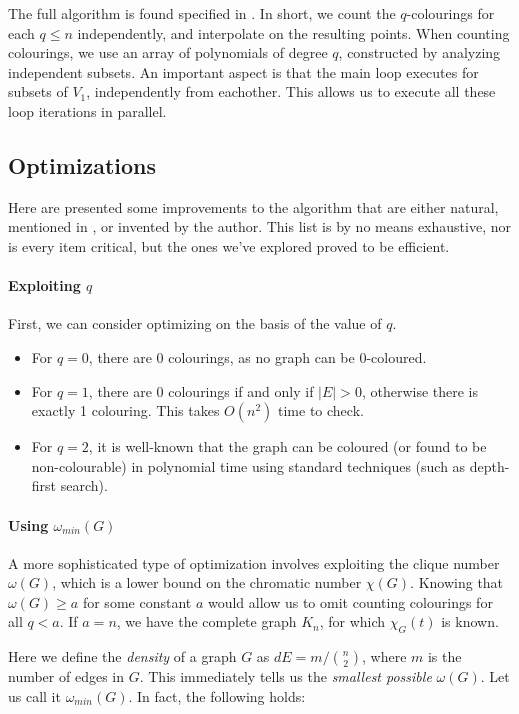 \documentclass[a4paper]{article}
\begin{document}
The full algorithm is found specified in \cite[p. 9]{cov_pack}. In short, we count the $q$-colourings for each $q \leq n$ independently, and interpolate on the resulting points. When counting colourings, we use an array of polynomials of degree $q$, constructed by analyzing independent subsets. An important aspect is that the main loop executes for subsets of $V_1$, independently from eachother. This allows us to execute all these loop iterations in parallel.

\subsection{Optimizations}\label{opts}
Here are presented some improvements to the algorithm that are either natural, mentioned in \cite{cov_pack}, or invented by the author. This list is by no means exhaustive, nor is every item critical, but the ones we've explored proved to be efficient.

\paragraph{Exploiting $q$}
First, we can consider optimizing on the basis of the value of $q$.
\begin{itemize}
\item For $q = 0$, there are 0 colourings, as no graph can be 0-coloured.
\item For $q = 1$, there are 0 colourings if and only if $|E| > 0$, otherwise there is exactly 1 colouring. This takes $O(n^2)$ time to check.
\item For $q = 2$, it is well-known that the graph can be coloured (or found to be non-colourable) in polynomial time using standard techniques (such as depth-first search).
\end{itemize}

\paragraph{Using $\omega_{min}(G)$}
A more sophisticated type of optimization involves exploiting the clique number $\omega(G)$, which is a lower bound on the chromatic number $\chi(G)$. Knowing that $\omega(G) \geq a$ for some constant $a$ would allow us to omit counting colourings for all $q < a$. If $a = n$, we have the complete graph $K_n$, for which $\chi_G(t)$ is known.

Here we define the \emph{density} of a graph $G$ as $dE = m/\binom{n}{2}$, where $m$ is the number of edges in $G$. This immediately tells us the \emph{smallest possible} $\omega(G)$. Let us call it $\omega_{min}(G)$. In fact, the following holds:
\end{document}
